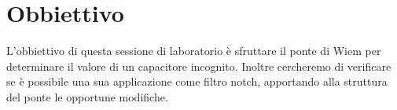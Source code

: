 \section*{Obbiettivo}

L'obbiettivo di questa sessione di laboratorio è sfruttare il ponte di Wiem per determinare il valore di un capacitore incognito.
Inoltre cercheremo di verificare se è possibile una sua applicazione come filtro notch, apportando alla struttura del ponte le opportune modifiche.
